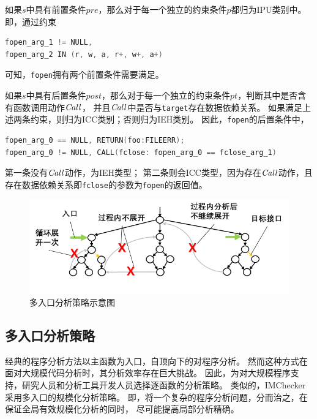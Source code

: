 如果$s$中具有前置条件$pre$，那么对于每一个独立的约束条件$p$都归为IPU类别中。
即，通过约束
\begin{lstlisting}[language={C},
basicstyle=\linespread{0.8}\listingsfont,
numbers=none,
xleftmargin=.25\textwidth]
fopen_arg_1 != NULL,
fopen_arg_2 IN (r, w, a, r+, w+, a+)
\end{lstlisting}
可知，\texttt{fopen}拥有两个前置条件需要满足。

如果$s$中具有后置条件$post$，那么对于每一个独立的约束条件$pt$，判断其中是否含有函数调用动作$\mathit{Call}$，
并且$\mathit{Call}$中是否与\texttt{target}存在数据依赖关系。
如果满足上述两条约束，则归为ICC类别；否则归为IEH类别。
因此，\texttt{fopen}的后置条件中，
\begin{lstlisting}[language={C},
basicstyle=\linespread{0.8}\listingsfont,
numbers=none,
xleftmargin=.15\textwidth]
fopen_arg_0 == NULL, RETURN(foo:FILEERR);
fopen_arg_0 != NULL, CALL(fclose: fopen_arg_0 == fclose_arg_1)
\end{lstlisting}
第一条没有$\mathit{Call}$动作，为IEH类型；
第二条则会ICC类型，因为存在$\mathit{Call}$动作，且存在数据依赖关系即\texttt{fclose}的参数为\texttt{fopen}的返回值。

\begin{figure}[t]
	\centering
	\includegraphics[width=0.9\linewidth]{figures/cp3-3-multi-entry.png}
	\caption{
		多入口分析策略示意图
	}
	\label{fig:3-3-multi-entry}
\end{figure}

\subsection{多入口分析策略}
经典的程序分析方法以主函数为入口，自顶向下的对程序分析。
然而这种方式在面对大规模代码分析时，其分析效率存在巨大挑战。
因此，为对大规模程序支持，研究人员和分析工具开发人员选择逐函数的分析策略。
类似的，IMChecker采用多入口的规模化分析策略。
即，将一个复杂的程序分析问题，分而治之，在保证全局有效规模化分析的同时，
尽可能提高局部分析精确。

